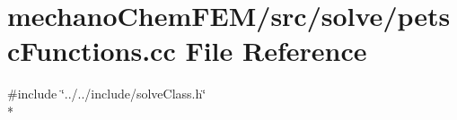 \section{mechano\-Chem\-F\-E\-M/src/solve/petsc\-Functions.cc File Reference}
\label{petsc_functions_8cc}
{\ttfamily \#include \char`\"{}../../include/solve\-Class.\-h\char`\"{}}\\*
